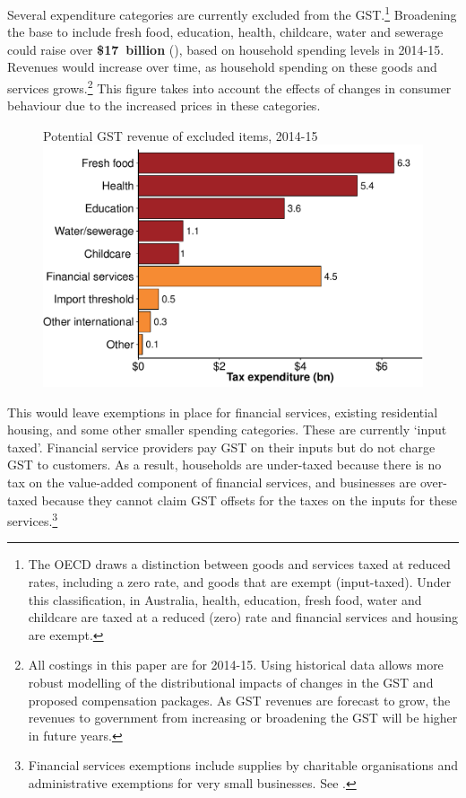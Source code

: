 \documentclass{grattanAlpha}
\begin{document}
Several expenditure categories are currently excluded from the GST.\footnote{The OECD draws a distinction between goods and services taxed at reduced rates, including a zero rate, and goods that are exempt (input-taxed). Under this classification, in Australia, health, education, fresh food, water and childcare are taxed at a reduced (zero) rate and financial services and housing are exempt.}  Broadening the base to include fresh food, education, health, childcare, water and sewerage could raise over \textbf{\$17~billion} (), based on household spending levels in 2014-15. Revenues would increase over time, as household spending on these goods and services grows.\footnote{All costings in this paper are for 2014-15. Using historical data allows more robust modelling of the distributional impacts of changes in the GST and proposed compensation packages. As GST revenues are forecast to grow, the revenues to government from increasing or broadening the GST will be higher in future years.} This figure takes into account the effects of changes in consumer behaviour due to the increased prices in these categories. 

\begin{figure}
%
{Potential GST revenue of excluded items, 2014-15}
\includegraphics[width=\columnwidth]{atlas/GST_revenue_of_excluded_items1415-1.pdf}

\end{figure}

This would leave exemptions in place for financial services, existing residential housing, and some other smaller spending categories.  These are currently ‘input taxed’. Financial service providers pay GST on their inputs but do not charge GST to customers.  As a result, households are under-taxed because there is no tax on the value-added component of financial services, and businesses are over-taxed because they cannot claim GST offsets for the taxes on the inputs for these services.\footnote{Financial services exemptions include supplies by charitable organisations and administrative exemptions for very small businesses. See \textcite[][169]{Treasury2014TES2013}.}
\end{document}
